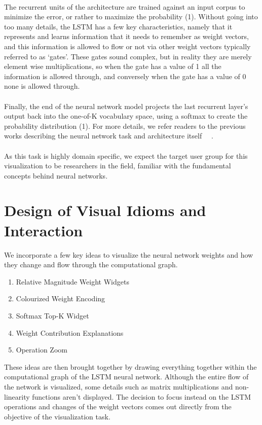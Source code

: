 \documentclass[journal]{vgtc}                %
\begin{document}
\\
The recurrent units of the architecture are trained against an input corpus to minimize the error, or rather to maximize the probability (1).
Without going into too many details, the LSTM has a few key characteristics, namely that it represents and learns information that it needs to remember as weight vectors, and this information is allowed to flow or not via other weight vectors typically referred to as `gates'.
These gates sound complex, but in reality they are merely element wise multiplications, so when the gate has a value of 1 all the information is allowed through, and conversely when the gate has a value of 0 none is allowed through.
\\
\\
Finally, the end of the neural network model projects the last recurrent layer's output back into the one-of-K vocabulary space, using a softmax to create the probability distribution (1).
For more details, we refer readers to the previous works describing the neural network task and architecture itself ~\cite{lstm}~\cite{lstmlm}.
\\
\\
As this task is highly domain specific, we expect the target user group for this visualization to be researchers in the field, familiar with the fundamental concepts behind neural networks.

\section{Design of Visual Idioms and Interaction}
We incorporate a few key ideas to visualize the neural network weights and how they change and flow through the computational graph.
\begin{enumerate}
    \item Relative Magnitude Weight Widgets
    \item Colourized Weight Encoding
    \item Softmax Top-K Widget
    \item Weight Contribution Explanations
    \item Operation Zoom
\end{enumerate}
These ideas are then brought together by drawing everything together within the computational graph of the LSTM neural network.
Although the entire flow of the network is visualized, some details such as matrix multiplications and non-linearity functions aren't displayed.
The decision to focus instead on the LSTM operations and changes of the weight vectors comes out directly from the objective of the visualization task.
\end{document}
